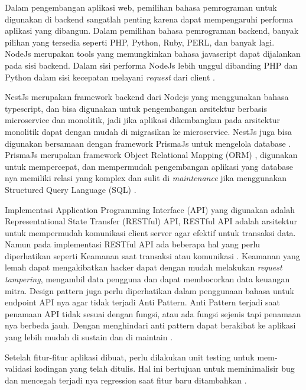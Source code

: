 Dalam pengembangan aplikasi web, pemilihan bahasa pemrograman untuk digunakan di backend sangatlah penting karena dapat mempengaruhi performa aplikasi yang dibangun. Dalam pemilihan bahasa pemrograman backend, banyak pilihan yang tersedia seperti PHP, Python, Ruby, PERL, dan banyak lagi. NodeJs merupakan tools yang memungkinkan bahasa javascript dapat dijalankan pada sisi backend. Dalam sisi performa NodeJs lebih unggul dibanding PHP dan Python dalam sisi kecepatan melayani \textit{request} dari client \cite{William2020} \cite{Odeniran2023}.

NestJs merupakan framework backend dari Nodejs yang menggunakan bahasa typescript, dan bisa digunakan untuk pengembangan arsitektur berbasis microservice dan monolitik, jadi jika aplikasi dikembangkan pada arsitektur monolitik dapat dengan mudah di migrasikan ke microservice. NestJs juga bisa digunakan bersamaan dengan framework PrismaJs untuk mengelola database \cite{NestJS}. PrismaJs merupakan framework Object Relational Mapping (ORM) \cite{Prisma}, digunakan untuk mempercepat, dan mempermudah pengembangan aplikasi yang database nya memiliki relasi yang komplex dan sulit di \textit{maintenance} jika menggunakan Structured Query Language (SQL) \cite{Zmaranda2020}.

Implementasi Application Programming Interface (API) yang digunakan adalah Representational State Transfer (RESTful) API, RESTful API adalah arsitektur untuk mempermudah komunikasi client server agar efektif untuk transaksi data. Namun pada implementasi RESTful API ada beberapa hal yang perlu diperhatikan seperti Keamanan saat transaksi  atau komunikasi \cite{Beer2018}. Keamanan yang lemah dapat mengakibatkan hacker dapat dengan mudah melakukan \textit{request tampering}, mengambil data pengguna dan dapat membocorkan data keuangan mitra. Design pattern juga perlu diperhatikan dalam penggunaan bahasa untuk endpoint API nya agar tidak terjadi Anti Pattern. Anti Pattern terjadi saat penamaan API tidak sesuai dengan fungsi, atau ada fungsi sejenis tapi penamaan nya berbeda jauh. Dengan menghindari anti pattern dapat berakibat ke aplikasi yang lebih mudah di sustain dan di maintain \cite{Aghajani2018} \cite{Alshraiedeh2021}.

Setelah fitur-fitur aplikasi dibuat, perlu dilakukan unit testing untuk mem-validasi kodingan yang telah ditulis. Hal ini bertujuan untuk meminimalisir bug dan mencegah terjadi nya regression saat fitur baru ditambahkan \cite{runeson2006survey}.

